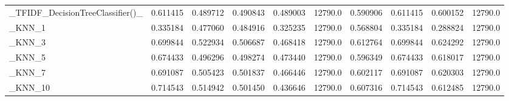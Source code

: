 \begin{tabular}{lrrrrrrrrr}
\_TFIDF\_DecisionTreeClassifier()\_                   &  0.611415 &         0.489712 &      0.490843 &        0.489003 &        12790.0 &            0.590906 &         0.611415 &           0.600152 &           12790.0 \\
\_KNN\_1                                             &  0.335184 &         0.477060 &      0.484916 &        0.325235 &        12790.0 &            0.568804 &         0.335184 &           0.288824 &           12790.0 \\
\_KNN\_3                                             &  0.699844 &         0.522934 &      0.506687 &        0.468418 &        12790.0 &            0.612764 &         0.699844 &           0.624292 &           12790.0 \\
\_KNN\_5                                             &  0.674433 &         0.496296 &      0.498274 &        0.473440 &        12790.0 &            0.596349 &         0.674433 &           0.618017 &           12790.0 \\
\_KNN\_7                                             &  0.691087 &         0.505423 &      0.501837 &        0.466446 &        12790.0 &            0.602117 &         0.691087 &           0.620303 &           12790.0 \\
\_KNN\_10                                            &  0.714543 &         0.514942 &      0.501450 &        0.436646 &        12790.0 &            0.607316 &         0.714543 &           0.612485 &           12790.0 \\
\bottomrule
\end{tabular}
